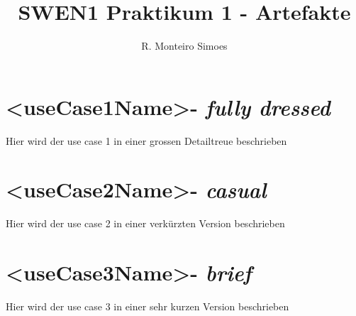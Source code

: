 \documentclass[journal]{combine}
\begin{document}
	
	\title{SWEN1 Praktikum 1 - Artefakte}
	\author{ R. Monteiro Simoes}
	\maketitle

	\newpage

	\tableofcontents

	\newpage
	
	\section{\textless useCase1Name\textgreater - \emph{fully dressed}}
		Hier wird der use case 1 in einer grossen Detailtreue beschrieben
	\newpage
	\section{\textless useCase2Name\textgreater - \emph{casual}}
		Hier wird der use case 2 in einer verkürzten Version beschrieben
	\newpage
	\section{\textless useCase3Name\textgreater - \emph{brief}}
		Hier wird der use case 3 in einer sehr kurzen Version beschrieben
\end{document}
